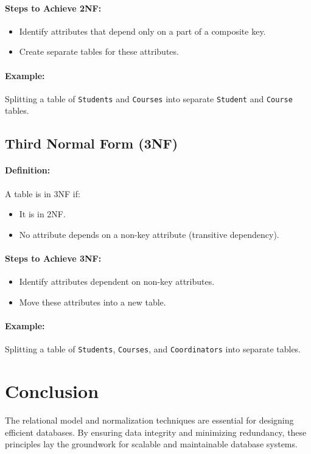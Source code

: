 \documentclass{article}
\begin{document}
\paragraph{Steps to Achieve 2NF:}
\begin{itemize}
    \item Identify attributes that depend only on a part of a composite key.
    \item Create separate tables for these attributes.
\end{itemize}

\paragraph{Example:}
Splitting a table of \texttt{Students} and \texttt{Courses} into separate \texttt{Student} and \texttt{Course} tables.

\subsection{Third Normal Form (3NF)}
\paragraph{Definition:}
A table is in 3NF if:
\begin{itemize}
    \item It is in 2NF.
    \item No attribute depends on a non-key attribute (transitive dependency).
\end{itemize}

\paragraph{Steps to Achieve 3NF:}
\begin{itemize}
    \item Identify attributes dependent on non-key attributes.
    \item Move these attributes into a new table.
\end{itemize}

\paragraph{Example:}
Splitting a table of \texttt{Students}, \texttt{Courses}, and \texttt{Coordinators} into separate tables.

\section{Conclusion}
The relational model and normalization techniques are essential for designing efficient databases. By ensuring data integrity and minimizing redundancy, these principles lay the groundwork for scalable and maintainable database systems.
\end{document}

